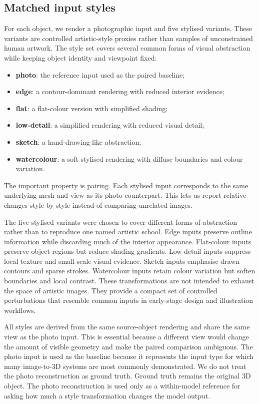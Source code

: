 \documentclass[12pt,a4paper]{article}
\begin{document}
\subsection{Matched input styles}

For each object, we render a photographic input and five stylised variants. These variants are controlled artistic-style proxies rather than samples of unconstrained human artwork. The style set covers several common forms of visual abstraction while keeping object identity and viewpoint fixed:
\begin{itemize}
    \item \textbf{photo}: the reference input used as the paired baseline;
    \item \textbf{edge}: a contour-dominant rendering with reduced interior evidence;
    \item \textbf{flat}: a flat-colour version with simplified shading;
    \item \textbf{low-detail}: a simplified rendering with reduced visual detail;
    \item \textbf{sketch}: a hand-drawing-like abstraction;
    \item \textbf{watercolour}: a soft stylised rendering with diffuse boundaries and colour variation.
\end{itemize}
The important property is pairing. Each stylised input corresponds to the same underlying mesh and view as its photo counterpart. This lets us report relative changes style by style instead of comparing unrelated images.

The five stylised variants were chosen to cover different forms of abstraction rather than to reproduce one named artistic school. Edge inputs preserve outline information while discarding much of the interior appearance. Flat-colour inputs preserve object regions but reduce shading gradients. Low-detail inputs suppress local texture and small-scale visual evidence. Sketch inputs emphasise drawn contours and sparse strokes. Watercolour inputs retain colour variation but soften boundaries and local contrast. These transformations are not intended to exhaust the space of artistic images. They provide a compact set of controlled perturbations that resemble common inputs in early-stage design and illustration workflows.

All styles are derived from the same source-object rendering and share the same view as the photo input. This is essential because a different view would change the amount of visible geometry and make the paired comparison ambiguous. The photo input is used as the baseline because it represents the input type for which many image-to-3D systems are most commonly demonstrated. We do not treat the photo reconstruction as ground truth. Ground truth remains the original 3D object. The photo reconstruction is used only as a within-model reference for asking how much a style transformation changes the model output.
\end{document}
